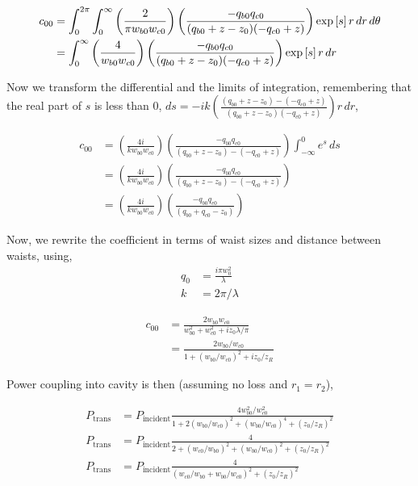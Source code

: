 \begin{align}
    c_{00} &= \int^{2 \pi}_{0} \int^{\infty}_{0}  \left( \frac{2}{\pi w_{b0} w_{c0}} \right)
    \left( \frac{- q_{b0} q_{c0}}{(q_{b0}+z-z_0)(-q_{c0}+z)} \right)
    \exp \left[ s
    \right] r \,dr \,d\theta \nonumber
\\  &= \int^{\infty}_{0} \left( \frac{4}{w_{b0} w_{c0}} \right)
    \left( \frac{- q_{b0} q_{c0}}{(q_{b0}+z-z_0)(-q_{c0}+z)} \right)
    \exp \left[ s
    \right] r \,dr
\end{align}

Now we transform the differential and the limits of integration, remembering
that the real part of $s$ is less than $0$, $ds =
-ik \left( \frac{(q_{b0}+z-z_0)-(-q_{c0}+z)}{(q_{b0}+z-z_0)(-q_{c0}+z)} \right) r \,dr
$,

\begin{align}
    c_{00} &= \left( \frac{4i}{k w_{b0} w_{c0}} \right)
    \left( \frac{- q_{b0} q_{c0}}{(q_{b0}+z-z_0)-(-q_{c0}+z)} \right)
    \int^{0}_{-\infty} e^s \,ds \nonumber
\\  &= \left( \frac{4i}{k w_{b0} w_{c0}} \right)
    \left( \frac{- q_{b0} q_{c0}}{(q_{b0}+z-z_0)-(-q_{c0}+z)} \right) \nonumber
\\  &= \left( \frac{4i}{k w_{b0} w_{c0}} \right)
    \left( \frac{- q_{b0} q_{c0}}{(q_{b0}+q_{c0}-z_0)} \right)
\end{align}

Now, we rewrite the coefficient in terms of waist sizes and distance between waists, using,
\begin{align*}
    q_0 &= \frac{i \pi w_0^2}{\lambda}
\\  k &= 2 \pi / \lambda
\end{align*}

\begin{align}
    c_{00} &= \frac{2 w_{b0} w_{c0}}{w_{b0}^2 + w_{c0}^2 + i z_0 \lambda / \pi} \nonumber
\\  &= \frac{2 w_{b0} / w_{c0}}{1 + \left( w_{b0} /w_{c0} \right)^2 + i z_0 / z_R}
\end{align}

Power coupling into cavity is then (assuming no loss and $r_1 = r_2$),


\begin{align}
    P_{\mathrm{trans}}  &= P_{\mathrm{incident}} \frac{4 w_{b0}^2 / w_{c0}^2}{1 +
    2 \left( w_{b0} /w_{c0} \right)^2 + \left( w_{b0} /w_{c0} \right)^4 + \left(
    z_0 / z_R \right)^2} \nonumber
\\  P_{\mathrm{trans}}  &= P_{\mathrm{incident}} \frac{4}{ 2 + \left( w_{c0} /
    w_{b0} \right)^2 + \left( w_{b0} /w_{c0} \right)^2 + \left(
    z_0 / z_R \right)^2}
\\  P_{\mathrm{trans}}  &= P_{\mathrm{incident}} \frac{4}{ \left( w_{c0} /
    w_{b0} + w_{b0} / w_{c0} \right)^2 + \left( z_0 / z_R \right)^2}
    \label{symetricmatch}
\end{align}

